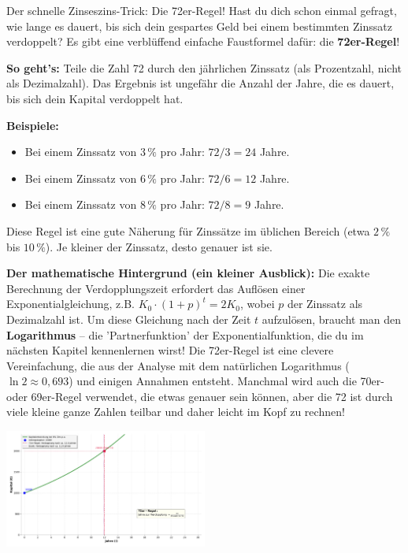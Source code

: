 \begin{funfactbox}{Der schnelle Zinseszins-Trick: Die 72er-Regel!}
Hast du dich schon einmal gefragt, wie lange es dauert, bis sich dein gespartes Geld bei einem bestimmten Zinssatz verdoppelt? Es gibt eine verblüffend einfache Faustformel dafür: die \textbf{72er-Regel}!

\textbf{So geht's:} Teile die Zahl 72 durch den jährlichen Zinssatz (als Prozentzahl, nicht als Dezimalzahl). Das Ergebnis ist ungefähr die Anzahl der Jahre, die es dauert, bis sich dein Kapital verdoppelt hat.

\textbf{Beispiele:}
\begin{itemize}
    \item Bei einem Zinssatz von $3\,\%$ pro Jahr: $72 / 3 = 24$ Jahre.
    \item Bei einem Zinssatz von $6\,\%$ pro Jahr: $72 / 6 = 12$ Jahre.
    \item Bei einem Zinssatz von $8\,\%$ pro Jahr: $72 / 8 = 9$ Jahre.
\end{itemize}
Diese Regel ist eine gute Näherung für Zinssätze im üblichen Bereich (etwa $2\,\%$ bis $10\,\%$). Je kleiner der Zinssatz, desto genauer ist sie.

\textbf{Der mathematische Hintergrund (ein kleiner Ausblick):}
Die exakte Berechnung der Verdopplungszeit erfordert das Auflösen einer Exponentialgleichung, z.B. $K_0 \cdot (1+p)^t = 2K_0$, wobei $p$ der Zinssatz als Dezimalzahl ist. Um diese Gleichung nach der Zeit $t$ aufzulösen, braucht man den \textbf{Logarithmus} – die 'Partnerfunktion' der Exponentialfunktion, die du im nächsten Kapitel kennenlernen wirst! Die 72er-Regel ist eine clevere Vereinfachung, die aus der Analyse mit dem natürlichen Logarithmus ($\ln 2 \approx 0,693$) und einigen Annahmen entsteht. Manchmal wird auch die 70er- oder 69er-Regel verwendet, die etwas genauer sein können, aber die 72 ist durch viele kleine ganze Zahlen teilbar und daher leicht im Kopf zu rechnen!

\begin{center}
    \includegraphics[width=0.5\textwidth]{grafiken/Regel_72_Zins.png}
    \label{fig:regel_72_funfact}
\end{center}
\end{funfactbox}

